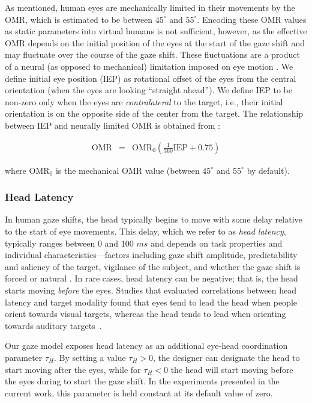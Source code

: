 As mentioned, human eyes are mechanically limited in their movements by the OMR, which is estimated to be between $45^{\circ}$ and $55^{\circ}$. Encoding these OMR values as static parameters into virtual humans is not sufficient, however, as the effective OMR depends on the initial position of the eyes at the start of the gaze shift and may fluctuate over the course of the gaze shift. These fluctuations are a product of a neural (as opposed to mechanical) limitation imposed on eye motion \cite{guitton1987gaze}. We define initial eye position (IEP) as rotational offset of the eyes from the central orientation (when the eyes are looking ``straight ahead''). We define IEP to be non-zero only when the eyes are \emph{contralateral} to the target, i.e., their initial orientation is on the opposite side of the center from the target. The relationship between IEP and neurally limited OMR is obtained from \citet{guitton1987gaze}:

\begin{eqnarray} \label{eq:AndristOMRIEP}
\mathrm{OMR} &=& \mathrm{OMR}_0 (\frac{1}{360} \mathrm{IEP} + 0.75)
\end{eqnarray}

where $\mathrm{OMR}_0$ is the mechanical OMR value (between $45^{\circ}$ and $55^{\circ}$ by default).

\subsubsection{Head Latency}

In human gaze shifts, the head typically begins to move with some delay relative to the start of eye movements. This delay, which we refer to as \emph{head latency}, typically ranges between 0 and 100 $ms$ and depends on task properties and individual characteristics---factors including gaze shift amplitude, predictability and saliency of the target, vigilance of the subject, and whether the gaze shift is forced or natural \cite{pelz2001coordination,zangemeister1982types}. In rare cases, head latency can be negative; that is, the head starts moving \emph{before} the eyes. Studies that evaluated correlations between head latency and target modality found that eyes tend to lead the head when people orient towards visual targets, whereas the head tends to lead when orienting towards auditory targets~\cite{goldring1996combined,goossens1997human}.

Our gaze model exposes head latency as an additional eye-head coordination parameter $\tau_H$. By setting a value $\tau_H > 0$, the designer can designate the head to start moving after the eyes, while for $\tau_H < 0$ the head will start moving before the eyes during to start the gaze shift. In the experiments presented in the current work, this parameter is held constant at its default value of zero.

